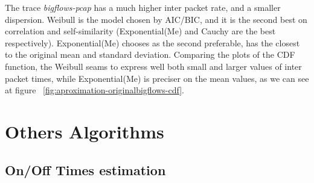 The trace \textit{bigflows-pcap} has a much higher inter packet rate, and a smaller dispersion. Weibull is the model chosen by AIC/BIC, and it is the second best on correlation and self-similarity (Exponential(Me) and Cauchy are the best respectively). Exponential(Me) chooses as the second preferable, has the closest to the original mean and standard deviation. Comparing the plots of the CDF function, the Weibull seams to express well both small and larger values of inter packet times, while Exponential(Me) is preciser on the mean values, as we can see at figure ~\ref{fig:aproximation-originalbigflows-cdf}. 


















\section{Others Algorithms}

\subsection{On/Off Times estimation}

